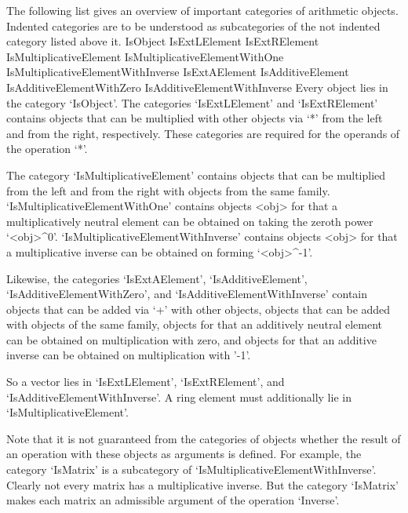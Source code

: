 The following list gives an overview of important categories of
arithmetic objects.
Indented categories are to be understood as subcategories of the not
indented category listed above it.
\beginexample
    IsObject
        IsExtLElement
        IsExtRElement
            IsMultiplicativeElement
                IsMultiplicativeElementWithOne
                    IsMultiplicativeElementWithInverse
        IsExtAElement
            IsAdditiveElement
                IsAdditiveElementWithZero
                    IsAdditiveElementWithInverse
\endexample
Every object lies in the category `IsObject'.
The categories `IsExtLElement' and `IsExtRElement' contains objects
that can be multiplied with other objects via `*' from the left and
from the right, respectively.
These categories are required for the operands of the operation `*'.

The category `IsMultiplicativeElement' contains objects that can be
multiplied from the left and from the right with objects from the
same family.
`IsMultiplicativeElementWithOne' contains objects <obj> for that a
multiplicatively neutral element can be obtained on taking the
zeroth power `<obj>^0'.
`IsMultiplicativeElementWithInverse' contains objects <obj> for that a
multiplicative inverse can be obtained on forming `<obj>^-1'.

Likewise, the categories `IsExtAElement', `IsAdditiveElement',
`IsAdditiveElementWithZero', and `IsAdditiveElementWithInverse'
contain objects that can be added via `+' with other objects,
objects that can be added with objects of the same family,
objects for that an additively neutral element can be obtained
on multiplication with zero,
and objects for that an additive inverse can be obtained on
multiplication with '-1'.

So a vector lies in `IsExtLElement', `IsExtRElement', and
`IsAdditiveElementWithInverse'.
A ring element must additionally lie in `IsMultiplicativeElement'.

Note that it is not guaranteed from the categories of objects whether
the result of an operation with these objects as arguments is defined.
For example, the category `IsMatrix' is a subcategory of
`IsMultiplicativeElementWithInverse'.
Clearly not every matrix has a multiplicative inverse.
But the category `IsMatrix' makes each matrix an admissible argument of
the operation `Inverse'.

